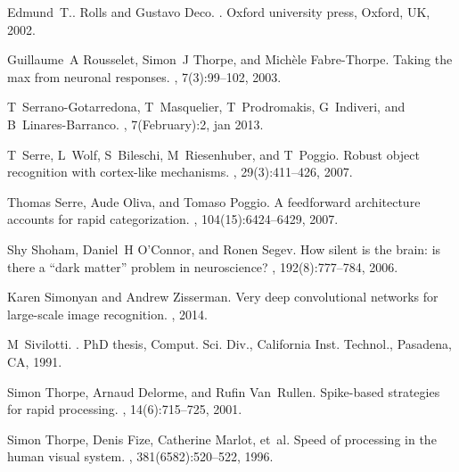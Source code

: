 \documentclass[preprint,5p,12pt,twocolumn]{article}
\begin{document}
\begin{thebibliography}{10}
Edmund~T.. Rolls and Gustavo Deco.
.
\newblock Oxford university press, Oxford, UK, 2002.

Guillaume~A Rousselet, Simon~J Thorpe, and Mich{\`e}le Fabre-Thorpe.
\newblock Taking the max from neuronal responses.
, 7(3):99--102, 2003.

T~Serrano-Gotarredona, T~Masquelier, T~Prodromakis, G~Indiveri, and
  B~Linares-Barranco.
, 7(February):2, jan 2013.

T~Serre, L~Wolf, S~Bileschi, M~Riesenhuber, and T~Poggio.
\newblock Robust object recognition with cortex-like mechanisms.
,
  29(3):411--426, 2007.

Thomas Serre, Aude Oliva, and Tomaso Poggio.
\newblock A feedforward architecture accounts for rapid categorization.
,
  104(15):6424--6429, 2007.

Shy Shoham, Daniel~H O’Connor, and Ronen Segev.
\newblock How silent is the brain: is there a “dark matter” problem in
  neuroscience?
, 192(8):777--784, 2006.

Karen Simonyan and Andrew Zisserman.
\newblock Very deep convolutional networks for large-scale image recognition.
, 2014.

M~Sivilotti.
.
\newblock PhD thesis, Comput. Sci. Div., California Inst. Technol., Pasadena,
  CA, 1991.

Simon Thorpe, Arnaud Delorme, and Rufin Van~Rullen.
\newblock Spike-based strategies for rapid processing.
, 14(6):715--725, 2001.

Simon Thorpe, Denis Fize, Catherine Marlot, et~al.
\newblock Speed of processing in the human visual system.
, 381(6582):520--522, 1996.


\end{thebibliography}
\end{document}
